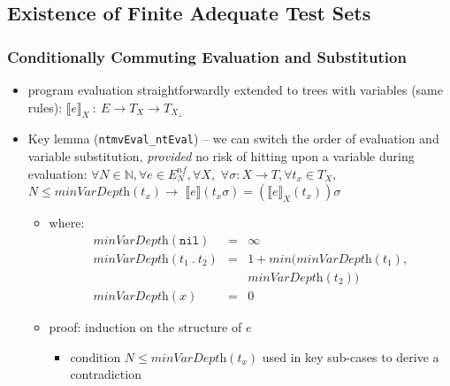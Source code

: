 \documentclass{beamer}
\begin{document}
\subsection{Existence of Finite Adequate Test Sets}

\begin{frame}
  \frametitle{Conditionally Commuting Evaluation and Substitution}
  \begin{itemize}
    \item program evaluation straightforwardly extended to trees with variables
      (same rules):
      $\llbracket e \rrbracket_X ~:~ E \rightarrow T_X \rightarrow T_{X_\perp}$
    \item Key lemma (\texttt{ntmvEval\_ntEval}) -- we can switch the order of evaluation 
      and variable substitution, \emph{provided} no risk of hitting upon a variable
      during evaluation:
      $\forall N \in \mathbb{N}, \forall e \in E^{nf}_N, \forall X,$
      $\forall \sigma : X \rightarrow T, \forall t_x \in T_X,$
      $N \le \textit{minVarDepth}(t_x) \rightarrow$
      $\llbracket e \rrbracket(t_x\sigma) = (\llbracket e \rrbracket_X(t_x))\sigma$
      \begin{itemize}
        \item where:
        \[\begin{array}{lcl}
        \textit{minVarDepth}(\texttt{nil}) & = & \infty \\
        \textit{minVarDepth}(t_1 ~.~ t_2) & = & 1 + \textit{min}(\textit{minVarDepth}(t_1), \\
                                          &   &  \textit{minVarDepth}(t_2)) \\
        \textit{minVarDepth}(x) & = & 0
        \end{array}
        \]
        \item proof: induction on the structure of $e$
          \begin{itemize}
            \item condition $N \le \textit{minVarDepth}(t_x)$ used in key sub-cases
              to derive a contradiction
          \end{itemize}
      \end{itemize}
  \end{itemize}
\end{frame}
\end{document}
